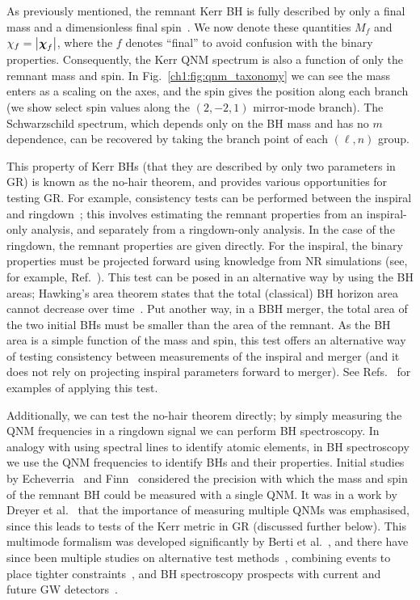 As previously mentioned, the remnant Kerr BH is fully described by only a final mass and a dimensionless final spin~\cite{Carter:1971zc}.
We now denote these quantities $M_f$ and $\chi_f = \abs{\vb*{\chi}_f}$, where the $f$ denotes ``final'' to avoid confusion with the binary properties.
Consequently, the Kerr QNM spectrum is also a function of only the remnant mass and spin.
In Fig.~\ref{ch1:fig:qnm_taxonomy} we can see the mass enters as a scaling on the axes, and the spin gives the position along each branch (we show select spin values along the $(2,-2,1)$ mirror-mode branch).
The Schwarzschild spectrum, which depends only on the BH mass and has no $m$ dependence, can be recovered by taking the branch point of each $(\ell, n)$ group.

This property of Kerr BHs (that they are described by only two parameters in GR) is known as the no-hair theorem, and provides various opportunities for testing GR.
For example, consistency tests can be performed between the inspiral and ringdown~\cite{Hughes:2004vw, Nakano:2015uja, Ghosh:2016qgn, Ghosh:2017gfp}; this involves estimating the remnant properties from an inspiral-only analysis, and separately from a ringdown-only analysis.
In the case of the ringdown, the remnant properties are given directly.
For the inspiral, the binary properties must be projected forward using knowledge from NR simulations (see, for example, Ref.~\cite{Varma:2018aht}).
This test can be posed in an alternative way by using the BH areas; Hawking's area theorem states that the total (classical) BH horizon area cannot decrease over time~\cite{Hawking:1971tu}.
Put another way, in a BBH merger, the total area of the two initial BHs must be smaller than the area of the remnant. 
As the BH area is a simple function of the mass and spin, this test offers an alternative way of testing consistency between measurements of the inspiral and merger (and it does not rely on projecting inspiral parameters forward to merger).
See Refs.~\cite{Cabero:2017avf, Isi:2020tac} for examples of applying this test.

Additionally, we can test the no-hair theorem directly; by simply measuring the QNM frequencies in a ringdown signal we can perform BH spectroscopy.
In analogy with using spectral lines to identify atomic elements, in BH spectroscopy we use the QNM frequencies to identify BHs and their properties.
Initial studies by Echeverria~\cite{Echeverria:1989hg} and Finn~\cite{Finn:1992wt} considered the precision with which the mass and spin of the remnant BH could be measured with a single QNM.
It was in a work by Dreyer et al.~\cite{Dreyer:2003bv} that the importance of measuring multiple QNMs was emphasised, since this leads to tests of the Kerr metric in GR (discussed further below).
This multimode formalism was developed significantly by Berti et al.~\cite{Berti:2005ys, Berti:2007zu}, and there have since been multiple studies on alternative test methods~\cite{Kamaretsos:2011um, Gossan:2011ha}, combining events to place tighter constraints~\cite{Meidam:2014jpa, Yang:2017zxs, DaSilvaCosta:2017njq, Carullo:2018sfu}, and BH spectroscopy prospects with current and future GW detectors~\cite{Berti:2016lat, Bhagwat:2016ntk, Maselli:2017kvl, Baibhav:2018rfk, Bhagwat:2019bwv, Cabero:2019zyt}.

